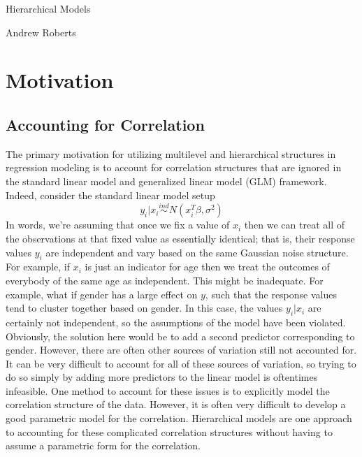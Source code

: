 \documentclass[12pt]{article}
\begin{document}
\begin{center}
\Large
Hierarchical Models
\end{center}

\begin{flushright}
Andrew Roberts
\end{flushright} 

\section{Motivation}

\subsection{Accounting for Correlation}
The primary motivation for utilizing multilevel and hierarchical structures in regression modeling is to account for correlation structures that are ignored in the standard linear model and generalized 
linear model (GLM) framework. Indeed, consider the standard linear model setup 
\[y_i|x_i \overset{ind}{\sim} N(x_i^T \beta, \sigma^2)\]
In words, we're assuming that once we fix a value of $x_i$ then we can treat all of the observations at that fixed value as essentially identical; that is, their response values $y_i$ are independent 
and vary based on the same Gaussian noise structure. For example, if $x_i$ is just an indicator for age then we treat the outcomes of everybody of the same age as independent. This might be inadequate. 
For example, what if gender has a large effect on $y$, such that the response values tend to cluster together based on gender. In this case, the values $y_i|x_i$ are certainly not independent, so the assumptions
of the model have been violated. Obviously, the solution here would be to add a second predictor corresponding to gender. However, there are often other sources of variation still not accounted for. It can be very 
difficult to account for all of these sources of variation, so trying to do so simply by adding more predictors to the linear model is oftentimes infeasible. One method to account for these issues is to explicitly model the 
correlation structure of the data. However, it is often very difficult to develop a good parametric model for the correlation. Hierarchical models are one approach to accounting for these
complicated correlation structures without having to assume a parametric form for the correlation. 
\end{document}
